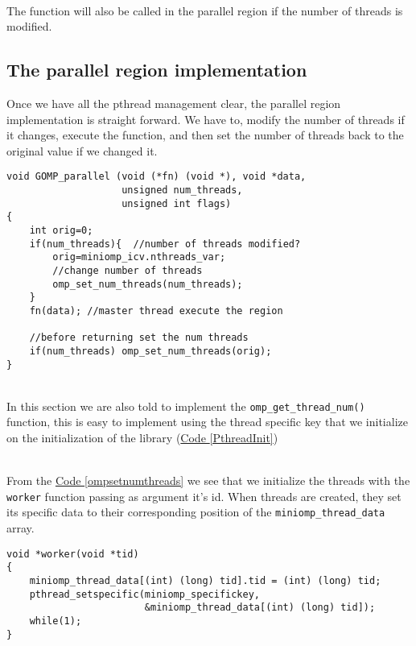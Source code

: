 \par ~\\
The function will also be called in the parallel region if the number of threads is modified.

\subsection{The parallel region implementation}
Once we have all the pthread management clear, the parallel region implementation is straight forward. We have to, modify the number of threads if it changes, execute the function, and then set the number of threads back to the original value if we changed it. 

\begin{lstlisting}[caption=Parallel region with no task support, label=parallelnotask]
void GOMP_parallel (void (*fn) (void *), void *data, 
                    unsigned num_threads,          
                    unsigned int flags)             
{
    int orig=0;
    if(num_threads){  //number of threads modified?
        orig=miniomp_icv.nthreads_var;
        //change number of threads
        omp_set_num_threads(num_threads);  
    }
    fn(data); //master thread execute the region
    
    //before returning set the num threads
    if(num_threads) omp_set_num_threads(orig);
}
\end{lstlisting}
\par ~\\
In this section we are also told to implement the \texttt{omp\_get\_thread\_num()} function, this is easy to implement using the thread specific key that we initialize on the initialization of the library (\hyperref[PthreadInit]{Code \ref*{PthreadInit}})

\par ~\\
From the \hyperref[ompsetnumthreads]{Code \ref*{ompsetnumthreads}} we see that we initialize the threads with the \texttt{worker} function passing as argument it's id. When threads are created, they set its specific data to their corresponding position of the \texttt{miniomp\_thread\_data} array.

\begin{lstlisting}[caption=\texttt{worker} function with no task support, label=workernotask]
void *worker(void *tid)
{
    miniomp_thread_data[(int) (long) tid].tid = (int) (long) tid;
    pthread_setspecific(miniomp_specifickey,
                        &miniomp_thread_data[(int) (long) tid]);
    while(1); 
}

\end{lstlisting}

